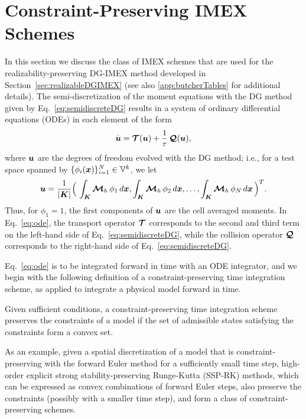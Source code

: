 \section{Constraint-Preserving IMEX Schemes}
\label{sec:imex}

In this section we discuss the class of IMEX schemes that are used for the realizability-preserving DG-IMEX method developed in Section~\ref{sec:realizableDGIMEX} (see also \ref{app:butcherTables} for additional details).  
The semi-discretization of the moment equations with the DG method given by Eq.~\eqref{eq:semidiscreteDG} results in a system of ordinary differential equations (ODEs) in each element of the form
\begin{equation}
  \dot{\boldsymbol{u}}
  =\boldsymbol{\mathcal{T}}(\boldsymbol{u})+\frac{1}{\tau}\,\boldsymbol{\mathcal{Q}}(\boldsymbol{u}),
  \label{eq:ode}
\end{equation}
where $\boldsymbol{u}$ are the degrees of freedom evolved with the DG method; i.e., for a test space spanned by $\{\phi_{i}(\boldsymbol{x})\}_{i=1}^{N}\in\mathbb{V}^{k}$, we let
\begin{equation}
  \boldsymbol{u}=\frac{1}{|\boldsymbol{K}|}\Big(\,\int_{\boldsymbol{K}}\boldsymbol{\mathcal{M}}_{h}\,\phi_{1}\,d\boldsymbol{x},\int_{\boldsymbol{K}}\boldsymbol{\mathcal{M}}_{h}\,\phi_{2}\,d\boldsymbol{x},\ldots,\int_{\boldsymbol{K}}\boldsymbol{\mathcal{M}}_{h}\,\phi_{N}\,d\boldsymbol{x}\,\Big)^{T}.
\end{equation}
Thus, for $\phi_{1}=1$, the first components of $\boldsymbol{u}$ are the cell averaged moments.  
In Eq.~\eqref{eq:ode}, the transport operator $\boldsymbol{\mathcal{T}}$ corresponds to the second and third term on the left-hand side of Eq.~\eqref{eq:semidiscreteDG}, while the collision operator $\boldsymbol{\mathcal{Q}}$ corresponds to the right-hand side of Eq.~\eqref{eq:semidiscreteDG}.  

Eq.~\eqref{eq:ode} is to be integrated forward in time with an ODE integrator, and we begin with the following definition of a constraint-preserving time integration scheme, as applied to integrate a physical model forward in time.  
\begin{define}
  Given sufficient conditions, a constraint-preserving time integration scheme preserves the constraints of a model if the set of admissible states satisfying the constraints form a convex set.  
  \label{def:constraintPreserving}
\end{define}
As an example, given a spatial discretization of a model that is constraint-preserving with the forward Euler method for a sufficiently small time step, high-order explicit strong stability-preserving Runge-Kutta (SSP-RK) methods, which can be expressed as convex combinations of forward Euler steps, also preserve the constraints (possibly with a smaller time step), and form a class of constraint-preserving schemes.  

